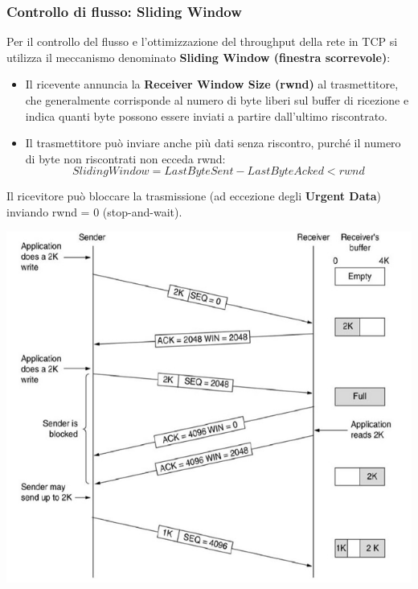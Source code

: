         \subsubsection{Controllo di flusso: Sliding Window}
            Per il controllo del flusso e l'ottimizzazione del throughput della rete in TCP si utilizza il meccanismo denominato \textbf{Sliding Window (finestra scorrevole)}:
            \begin{itemize}
                \item Il ricevente annuncia la \textbf{Receiver Window Size (rwnd)} al trasmettitore, che generalmente corrisponde al numero di byte liberi sul buffer di ricezione e indica quanti byte possono essere inviati a partire dall'ultimo riscontrato.
                \item Il trasmettitore può inviare anche più dati senza riscontro, purché il numero di byte non riscontrati non ecceda rwnd:
                \begin{equation*}
                    SlidingWindow = LastByteSent - LastByteAcked < rwnd
                \end{equation*}
            \end{itemize}

            Il ricevitore può bloccare la trasmissione (ad eccezione degli \textbf{Urgent Data}) inviando rwnd = 0 (stop-and-wait).

            \begin{center}
                \includegraphics[scale=0.4]{chapters/5/assets/schema_j.png}
            \end{center}

